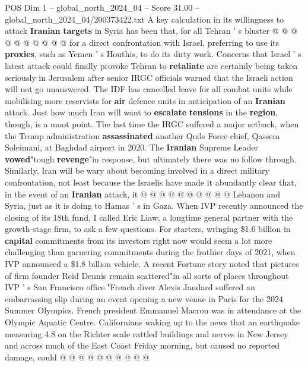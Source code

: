 \begin{textsample}{POS Dim 1 – global\_north\_2024\_04 – Score 31.00 – global\_north\_2024\_04/200373422.txt}
A key calculation in its willingness to attack \textbf{Iranian} \textbf{targets} in Syria has been that, for all Tehran ' s bluster @ @ @ @ @ @ @ @ @ @ for a direct confrontation with Israel, preferring to use its \textbf{proxies}, such as Yemen ' s Houthis, to do its dirty work.
Concerns that Israel ' s latest attack could finally provoke Tehran to \textbf{retaliate} are certainly being taken seriously in Jerusalem after senior IRGC officials warned that the Israeli action will not go unanswered.
The IDF has cancelled leave for all combat units while mobilising more reservists for \textbf{air} defence units in anticipation of an \textbf{Iranian} attack.
Just how much Iran will want to \textbf{escalate} \textbf{tensions} in the \textbf{region}, though, is a moot point.
The last time the IRGC suffered a major setback, when the Trump administration \textbf{assassinated} another Quds Force chief, Qassem Soleimani, at Baghdad airport in 2020.
The \textbf{Iranian} Supreme Leader \textbf{vowed}"tough \textbf{revenge}"in response, but ultimately there was no follow through.
Similarly, Iran will be wary about becoming involved in a direct military confrontation, not least because the Israelis have made it abundantly clear that, in the event of an \textbf{Iranian} attack, it @ @ @ @ @ @ @ @ @ @ Lebanon and Syria, just as it is doing to Hamas ' s in Gaza.
When IVP recently announced the closing of its 18th fund, I called Eric Liaw, a longtime general partner with the growth-stage firm, to ask a few questions.
For starters, wringing \$1.6 billion in \textbf{capital} commitments from its investors right now would seem a lot more challenging than garnering commitments during the frothier days of 2021, when IVP announced a \$1.8 billion vehicle.
A recent Fortune story noted that pictures of firm founder Reid Dennis remain scattered"in all sorts of places throughout IVP ' s San Francisco office."French diver Alexis Jandard suffered an embarrassing slip during an event opening a new venue in Paris for the 2024 Summer Olympics.
French president Emmanuel Macron was in attendance at the Olympic Aquatic Centre.
Californians waking up to the news that an earthquake measuring 4.8 on the Richter scale rattled buildings and nerves in New Jersey and across much of the East Coast Friday morning, but caused no reported damage, could @ @ @ @ @ @ @ @ @ @

\end{textsample}
